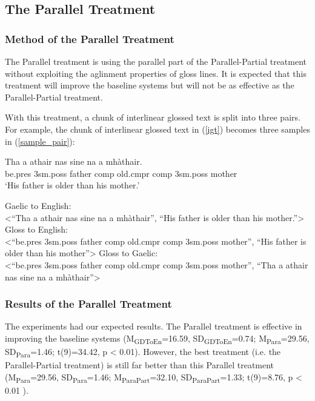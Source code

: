 \documentclass[11pt,a4paper]{article}
\begin{document}
\subsection{The Parallel Treatment}\label{treatment:Para}
\subsubsection{Method of the Parallel Treatment}
The Parallel treatment is using the parallel part of the Parallel-Partial treatment without exploiting the aglinment properties of gloss lines.
It is expected that this treatment will improve the baseline systems but will not be as effective as the Parallel-Partial treatment.

With this treatment, a chunk of interlinear glossed text is split into three pairs. For example, the chunk of interlinear glossed text in (\ref{igt}) becomes three samples in (\ref{sample_pair}): 
\begin{exe} 
\ex \label{igt}
	\gll    Tha a athair nas sine na a mh\`athair.\\  
            be.pres 3sm.poss father comp old.cmpr comp 3sm.poss mother \\
    \glt    `His father is older than his mother.'  
\end{exe}


\begin{exe} 
	\ex \label{sample_pair}
	\begin{xlist}
		\ex Gaelic to English: \\<``Tha a athair nas sine na a mh\`athair'', ``His father is older than his mother.''>
		\ex Gloss to English: \\<``be.pres 3sm.poss father comp old.cmpr comp 3sm.poss mother'', ``His father is older than his mother''>
		\ex Gloss to Gaelic: \\<``be.pres 3sm.poss father comp old.cmpr comp 3sm.poss mother'', ``Tha a athair nas sine na a mh\`athair''>
	\end{xlist}
\end{exe}

\subsubsection{Results of the Parallel Treatment}\label{treatment:Para_result}
The experiments had our expected results.  
The Parallel treatment is effective in improving the baseline systems (M\textsubscript{GDToEn}=16.59, SD\textsubscript{GDToEn}=0.74; M\textsubscript{Para}=29.56, SD\textsubscript{Para}=1.46; t(9)=34.42, p < 0.01). 
However, the best treatment (i.e. the Parallel-Partial treatment) is still far better than this Parallel treatment 
(M\textsubscript{Para}=29.56, SD\textsubscript{Para}=1.46; M\textsubscript{ParaPart}=32.10, SD\textsubscript{ParaPart}=1.33; t(9)=8.76, p < 0.01 ).
\end{document}
